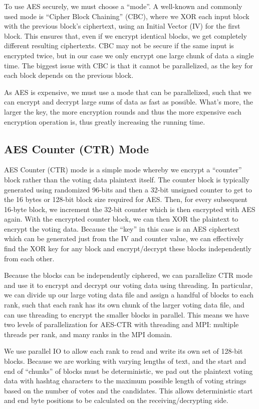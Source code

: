 \documentclass[final,5p,times,twocolumn,authoryear, 10pt]{elsarticle}
\begin{document}
To use AES securely, we must choose a ``mode''. A well-known and commonly used
mode is ``Cipher Block Chaining'' (CBC), where we XOR each input block with the
previous block's ciphertext, using an Initial Vector (IV) for the first block.
This ensures that, even if we encrypt identical blocks, we get completely
different resulting ciphertexts. CBC may not be secure if the same input is
encrypted twice, but in our case we only encrypt one large chunk of data a
single time. The biggest issue with CBC is that it cannot be parallelized, as
the key for each block depends on the previous block.

As AES is expensive, we must use a mode that can be parallelized, such that we
can encrypt and decrypt large sums of data as fast as possible. What's more,
the larger the key, the more encryption rounds and thus the more expensive each
encryption operation is, thus greatly increasing the running time.

\subsection{AES Counter (CTR) Mode}

AES Counter (CTR) mode is a simple mode whereby we encrypt a ``counter'' block
rather than the voting data plaintext itself. The counter block is typically
generated using randomized 96-bits and then a 32-bit unsigned counter to get to
the 16 bytes or 128-bit block size required for AES. Then, for every subsequent
16-byte block, we increment the 32-bit counter which is then encrypted with AES
again. With the encrypted counter block, we can then XOR the plaintext to
encrypt the voting data. Because the ``key'' in this case is an AES ciphertext
which can be generated just from the IV and counter value, we can effectively
find the XOR key for any block and encrypt/decrypt these blocks independently
from each other.

Because the blocks can be independently ciphered, we can parallelize CTR mode
and use it to encrypt and decrypt our voting data using threading. In
particular, we can divide up our large voting data file and assign a handful of
blocks to each rank, such that each rank has its own chunk of the larger voting
data file, and can use threading to encrypt the smaller blocks in parallel.
This means we have two levels of parallelization for AES-CTR with threading and
MPI: multiple threads per rank, and many ranks in the MPI domain.

We use parallel IO to allow each rank to read and write its own set of 128-bit
blocks. Because we are working with varying lengths of text, and the start and
end of ``chunks'' of blocks must be deterministic, we pad out the plaintext
voting data with hashtag characters to the maximum possible length of voting
strings based on the number of votes and the candidates. This allows
deterministic start and end byte positions to be calculated on the
receiving/decrypting side.
\end{document}
